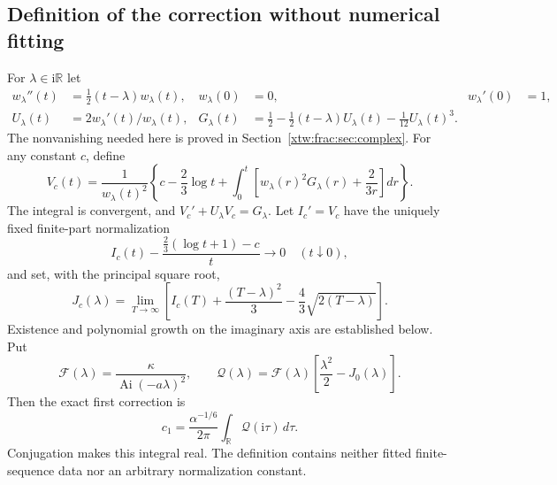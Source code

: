 \documentclass[11pt]{article}
\theoremstyle{remark}\newtheorem{remark}[theorem]{Remark}
\newcommand{\R}{\mathbb R}
\newcommand{\Ai}{\operatorname{Ai}}
\newcommand{\ii}{\mathrm i}
\newcommand{\FF}{\mathcal F}
\newcommand{\QQ}{\mathcal Q}
\begin{document}
\subsection{Definition of the correction without numerical fitting}
For $\lambda\in\ii\R$ let
\begin{align}
 w_\lambda''(t)&=\tfrac12(t-\lambda)w_\lambda(t),
 &w_\lambda(0)&=0,&w_\lambda'(0)&=1,\label{xtw:frac:eq:wode}\\
 U_\lambda(t)&=2w_\lambda'(t)/w_\lambda(t),
 &G_\lambda(t)&=\tfrac12-\tfrac12(t-\lambda)U_\lambda(t)
                              -\tfrac1{12}U_\lambda(t)^3.
\end{align}
The nonvanishing needed here is proved in Section~\ref{xtw:frac:sec:complex}.
For any constant $c$, define
\begin{equation}\label{xtw:frac:eq:Vdefinition}
 V_c(t)=\frac1{w_\lambda(t)^2}
 \left\{c-\frac23\log t+
 \int_0^t\left[w_\lambda(r)^2G_\lambda(r)+\frac2{3r}\right]dr\right\}.
\end{equation}
The integral is convergent, and $V_c'+U_\lambda V_c=G_\lambda$.
Let $I_c'=V_c$ have the uniquely fixed finite-part normalization
\begin{equation}\label{xtw:frac:eq:Idefinition}
 I_c(t)-\frac{\frac23(\log t+1)-c}{t}\longrightarrow0
 \quad(t\downarrow0),
\end{equation}
and set, with the principal square root,
\begin{equation}\label{xtw:frac:eq:Jdefinition}
 J_c(\lambda)=\lim_{T\to\infty}
 \left[I_c(T)+\frac{(T-\lambda)^2}{3}
                    -\frac43\sqrt{2(T-\lambda)}\right].
\end{equation}
Existence and polynomial growth on the imaginary axis are established below.
Put
\begin{equation}\label{xtw:frac:eq:FQ}
 \FF(\lambda)=\frac{\kappa}{\Ai(-a\lambda)^2},\qquad
 \QQ(\lambda)=\FF(\lambda)\left[\frac{\lambda^2}{2}-J_0(\lambda)\right].
\end{equation}
Then the exact first correction is
\begin{equation}\label{xtw:frac:eq:c1definition}
 c_1=\frac{\alpha^{-1/6}}{2\pi}\int_{\R}\QQ(\ii\tau)\,d\tau.
\end{equation}
Conjugation makes this integral real. The definition contains neither fitted
finite-sequence data nor an arbitrary normalization constant.
\end{document}
